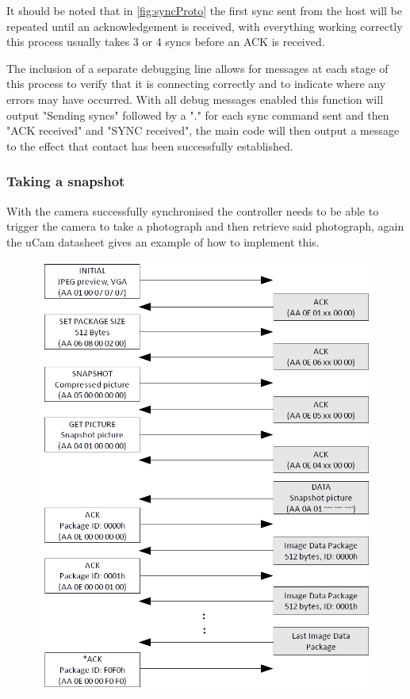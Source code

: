 It should be noted that in \ref{fig:syncProto} the first sync sent from the host will be repeated until an acknowledgement is received, with everything working correctly this process usually takes 3 or 4 syncs before an ACK is received.

The inclusion of a separate debugging line allows for messages at each stage of this process to verify that it is connecting correctly and to indicate where any errors may have occurred. With all debug messages enabled this function will output "Sending syncs" followed by a "." for each sync command sent and then "ACK received" and "SYNC received", the main code will then output a message to the effect that contact has been successfully established.

\subsubsection{Taking a snapshot}

With the camera successfully synchronised the controller needs to be able to trigger the camera to take a photograph and then retrieve said photograph, again the uCam datasheet \cite{ucam_datasheet} gives an example of how to implement this.

\begin{figure}[H]
        \centering
        \includegraphics[width=1.00\textwidth]{figures/SnapshotProtocal.png}
        \label{fig:snapProto}
\end{figure}

